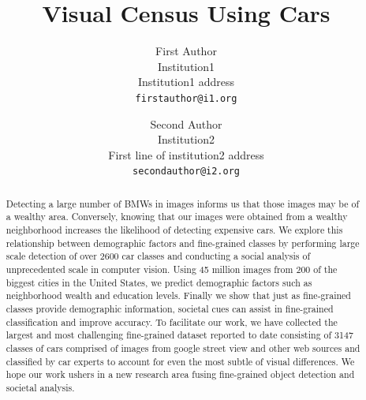 \documentclass[10pt,twocolumn,letterpaper]{article}
\begin{document}
\title{Visual Census Using Cars}

\author{First Author\\
Institution1\\
Institution1 address\\
{\tt\small firstauthor@i1.org}
\and
Second Author\\
Institution2\\
First line of institution2 address\\
{\tt\small secondauthor@i2.org}
}

\maketitle

\begin{abstract}
Detecting a large number of BMWs in images informs us that those images may be of a wealthy area. Conversely, knowing that our images were obtained from a wealthy neighborhood increases the likelihood of detecting expensive cars. We explore this relationship between demographic factors and fine-grained classes by performing large scale detection of over 2600 car classes and conducting a social analysis of unprecedented scale in computer vision. Using 45 million images from 200 of the biggest cities in the United States, we predict demographic factors such as neighborhood wealth and education levels. Finally we show that just as fine-grained classes provide demographic information, societal cues can assist in fine-grained classification and improve accuracy. To facilitate our work, we have collected the largest and most challenging fine-grained dataset reported to date consisting of 3147 classes of cars comprised of images from google street view and other web sources and classified by car experts to account for even the most subtle of visual differences. We hope our work ushers in a new research area fusing fine-grained object detection and societal analysis.

\end{abstract}
\end{document}
